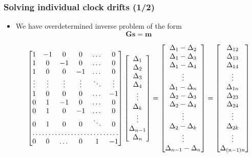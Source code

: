 \documentclass{beamer}
\begin{document}
\begin{frame}%
\frametitle{Solving individual clock drifts (1/2)}
\begin{itemize}
\item We have overdetermined inverse problem of the form
\begin{equation}
\mathbf{Gs} = \mathbf{m}
\end{equation}

\footnotesize
\begin{equation*}
\begin{bmatrix}
1 & -1 & 0 & 0 & \dots  & 0 \\
1 & 0 & -1 & 0 & \dots  & 0 \\
1 &  0  & 0 & -1 & \dots   & 0 \\
\vdots & \vdots & \vdots  & \vdots & \ddots & \vdots \\
1 &  0  & 0 & 0 & \dots & -1 \\
0 &  1  & -1 & 0 & \dots & 0 \\
0 & 1 & 0 & -1 & \dots & 0 \\
0 & 1 & 0 & 0 & \ddots & 0 \\
\hdotsfor{6} \\
0 & 0 & \dots & 0& 1 & -1
\end{bmatrix}
 \begin{bmatrix}
\Delta_1 \\ \Delta_2 \\ \Delta_3 \\ \Delta_4 \\ \vdots \\ \Delta_k \\ \vdots \\ \Delta_{n-1} \\ \Delta_n
\end{bmatrix}
 = 
 \begin{bmatrix}
 \Delta_1 - \Delta_2 \\ \Delta_1-\Delta_3 \\ \Delta_1-\Delta_4 \\ \vdots \\ \Delta_1 - \Delta_{n} \\ \Delta_2- \Delta_3 \\ \Delta_2 - \Delta_4 \\ \vdots  \\ \Delta_2-\Delta_k \\ \vdots \\ \Delta_{n-1} - \Delta_n
 \end{bmatrix}
= 
\begin{bmatrix}
\Delta_{12} \\ \Delta_{13} \\ \Delta_{14} \\ \vdots \\ \Delta_{1n} \\ \Delta_{23} \\ \Delta_{24} \\ \vdots \\ \Delta_{2k} \\ \vdots \\ \Delta_{(n-1)n}
\end{bmatrix} 
\end{equation*}
\normalsize


\end{itemize}
\end{frame}
\end{document}
